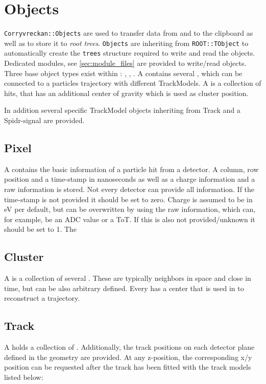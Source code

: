\section{Objects}
\label{sec:objects}
\texttt{Corryvreckan::Objects} are used to transfer data from and to the clipboard as well as to store it to \textit{root trees}. 
\texttt{Objects} are inheriting from \texttt{ROOT::TObject} to automatically create the \texttt{trees} structure required to write and read the objects. 
Dedicated modules, see \ref{sec:module_files} are provided to write/read objects.
Three base object types exist within \corry : \pixel, \cluster, \track.
A \track contains several \cluster, which can be connected to a particles
trajectory with different TrackModels.
A \cluster is a collection of hits, that has an additional center of gravity
which is used as cluster position.

In addition several specific TrackModel objects inheriting from Track and a Spidr-signal are provided. 

\subsection{Pixel}
A \pixel contains the basic information of a particle hit from a detector. A column, row position and a time-stamp in nanoseconds as well as a charge information and a raw information is stored. Not every detector can provide all information. If the time-stamp is not provided it should be set to zero. Charge is assumed to be in eV per default, but can be overwritten by using the raw information, which can, for example, be an ADC value or a ToT. If this is also not provided/unknown it should be set to 1. The

\subsection{Cluster}
A \cluster is a collection of several \pixel. These \pixel are typically
neighbors in space and close in time, but can be also arbitrary
defined. Every \cluster has a center that is used in \track to reconstruct a trajectory.  

\subsection{Track}
A \track holds a collection of \cluster. Additionally, the track positions on
each detector plane defined in the geometry are provided. At any z-position, the
corresponding x/y position can be requested after the track has been fitted
with the track models listed below:

